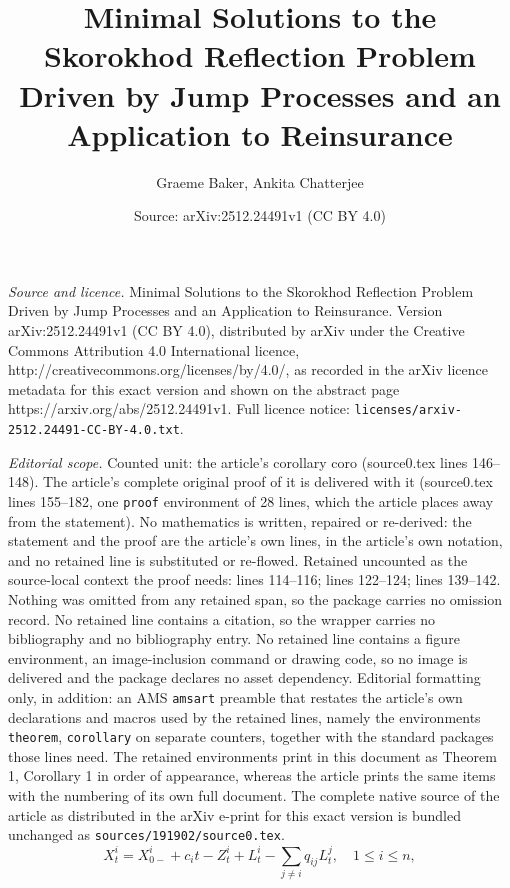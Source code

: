 \documentclass[10pt,a4paper]{amsart}
\title{Minimal Solutions to the Skorokhod Reflection Problem Driven by Jump Processes and an Application to Reinsurance}
\author{Graeme Baker, Ankita Chatterjee}
\date{Source: arXiv:2512.24491v1 (CC BY 4.0)}
\begin{document}
\maketitle

\noindent\emph{Source and licence.} Minimal Solutions to the Skorokhod Reflection Problem Driven by Jump Processes and an Application to Reinsurance. Version arXiv:2512.24491v1 (CC BY 4.0), distributed by arXiv under the Creative Commons Attribution 4.0 International licence, http://creativecommons.org/licenses/by/4.0/, as recorded in the arXiv licence metadata for this exact version and shown on the abstract page https://arxiv.org/abs/2512.24491v1. Full licence notice: \texttt{licenses/arxiv-2512.24491-CC-BY-4.0.txt}.\par\smallskip

\noindent\textit{Editorial scope.} Counted unit: the article's corollary coro (source0.tex lines 146--148). The article's complete original proof of it is delivered with it (source0.tex lines 155--182, one \texttt{proof} environment of 28 lines, which the article places away from the statement). No mathematics is written, repaired or re-derived: the statement and the proof are the article's own lines, in the article's own notation, and no retained line is substituted or re-flowed.  Retained uncounted as the source-local context the proof needs: lines 114--116; lines 122--124; lines 139--142.  Nothing was omitted from any retained span, so the package carries no omission record.  No retained line contains a citation, so the wrapper carries no bibliography and no bibliography entry.  No retained line contains a figure environment, an image-inclusion command or drawing code, so no image is delivered and the package declares no asset dependency.  Editorial formatting only, in addition: an AMS \texttt{amsart} preamble that restates the article's own declarations and macros used by the retained lines, namely the environments \texttt{theorem}, \texttt{corollary} on separate counters, together with the standard packages those lines need.  The retained environments print in this document as Theorem 1, Corollary 1 in order of appearance, whereas the article prints the same items with the numbering of its own full document.  The complete native source of the article as distributed in the arXiv e-print for this exact version is bundled unchanged as \texttt{sources/191902/source0.tex}.
\begin{equation}\label{eq:ps}
X_t^i=X_{0-}^i+c_it-Z_t^i+L_t^i-\sum_{j\neq i}q_{ij}L_t^j,\quad 1\le i\le n,
\end{equation}
\end{document}
